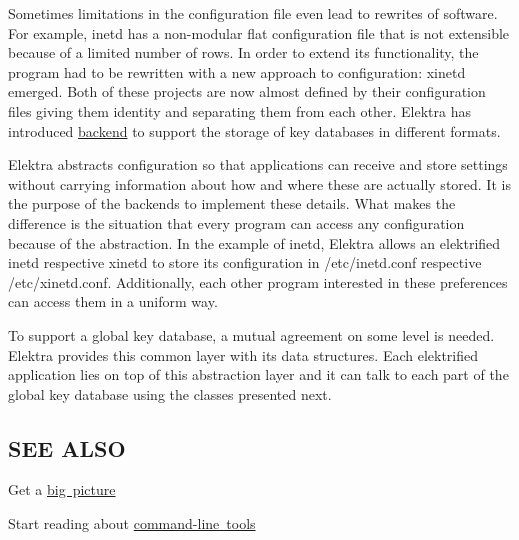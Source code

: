Sometimes limitations in the configuration file even lead to rewrites of software. For example, inetd has a non-\/modular flat configuration file that is not extensible because of a limited number of rows. In order to extend its functionality, the program had to be rewritten with a new approach to configuration\+: xinetd emerged. Both of these projects are now almost defined by their configuration files giving them identity and separating them from each other. Elektra has introduced \mbox{\hyperlink{doc_help_elektra-backends_md}{backend}} to support the storage of key databases in different formats.

Elektra abstracts configuration so that applications can receive and store settings without carrying information about how and where these are actually stored. It is the purpose of the backends to implement these details. What makes the difference is the situation that every program can access any configuration because of the abstraction. In the example of inetd, Elektra allows an elektrified inetd respective xinetd to store its configuration in /etc/inetd.conf respective /etc/xinetd.conf. Additionally, each other program interested in these preferences can access them in a uniform way.

To support a global key database, a mutual agreement on some level is needed. Elektra provides this common layer with its data structures. Each elektrified application lies on top of this abstraction layer and it can talk to each part of the global key database using the classes presented next.\hypertarget{doc_help_elektra-introduction_md_autotoc_md1573}{}\subsection{S\+E\+E A\+L\+SO}\label{doc_help_elektra-introduction_md_autotoc_md1573}

\begin{DoxyItemize}
\item Get a \mbox{\hyperlink{doc_BIGPICTURE_md}{big picture}}
\item Start reading about \mbox{\hyperlink{doc_help_kdb_md}{command-\/line tools}} 
\end{DoxyItemize}